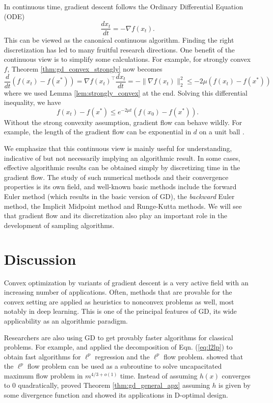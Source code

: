In continuous time, gradient descent follows the Ordinary Differential
Equation (ODE) 
\[
\frac{dx_{t}}{dt}=-\nabla f(x_{t}).
\]
This can be viewed as the canonical continuous algorithm. Finding
the right discretization has led to many fruitful research directions.
One benefit of the continuous view is to simplify some calculations.
For example, for strongly convex $f$, Theorem \ref{thm:gd_convex_strongly}
now becomes
\[
\frac{d}{dt}(f(x_{t})-f(x^{*}))=\nabla f(x_{t})^{\top}\frac{dx_{t}}{dt}=-\|\nabla f(x_{t})\|^{2}_{2}\leq-2\mu\left(f(x_{t})-f(x^{*})\right)
\]
where we used Lemma \ref{lem:strongly_convex} at the end. Solving
this differential inequality, we have
\[
f(x_{t})-f(x^{*})\leq e^{-2\mu t}(f(x_{0})-f(x^{*})).
\]
Without the strong convexity assumption, gradient flow can behave
wildly. For example, the length of the gradient flow can be exponential
in $d$ on a unit ball \cite{manselli1991maximum}. 

We emphasize that this continuous view is mainly useful for understanding,
indicative of but not necessarily implying an algorithmic result.
In some cases, effective algorithmic results can be obtained simply
by discretizing time in the gradient flow. The study of such numerical
methods and their convergence properties is its own field, and well-known
basic methods include the forward Euler method (which results in the
basic version of GD), the \emph{backward }Euler method, the Implicit
Midpoint method and Runge-Kutta methods. We will see that gradient
flow and its discretization also play an important role in the development
of sampling algorithms.

\section{Discussion}

Convex optimization by variants of gradient descent is a very active
field with an increasing number of applications. Often, methods that
are provable for the convex setting are applied as heuristics to nonconvex
problems as well, most notably in deep learning. This is one of the
principal features of GD, its wide applicability as an algorithmic
paradigm. 

Researchers are also using GD to get provably faster algorithms for
classical problems. For example, \cite{adil2019iterative} and \cite{kyng2019flows}
applied the decomposition of Eqn. (\ref{eq:l2lp}) to obtain fast
algorithms for $\ell^{p}$ regression and the $\ell^{p}$ flow problem.
\cite{kathuria2020unit} showed that the $\ell^{p}$ flow problem
can be used as a subroutine to solve uncapacitated maximum flow problem
in $m^{4/3+o(1)}$ time. Instead of assuming $h(x)$ converges to
$0$ quadratically, \cite{lu2016relatively} proved Theorem \ref{thm:gd_general_apx}
assuming $h$ is given by some divergence function and showed its
applications in D-optimal design.
